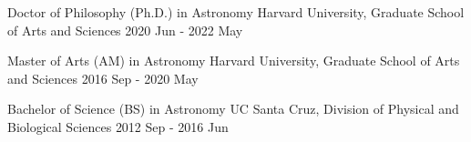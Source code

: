 
\begin{cvhonors}
  \cvhonor
    {Doctor of Philosophy (Ph.D.) in Astronomy} %
    {Harvard University, Graduate School of Arts and Sciences} %
    {2020 Jun - 2022 May} %
    
  \cvhonor
    {Master of Arts (AM) in Astronomy} %
    {Harvard University, Graduate School of Arts and Sciences} %
    {2016 Sep - 2020 May} %
    
  \cvhonor
    {Bachelor of Science (BS) in Astronomy} %
    {UC Santa Cruz, Division of Physical and Biological Sciences} %
    {2012 Sep - 2016 Jun} %
    
\end{cvhonors}